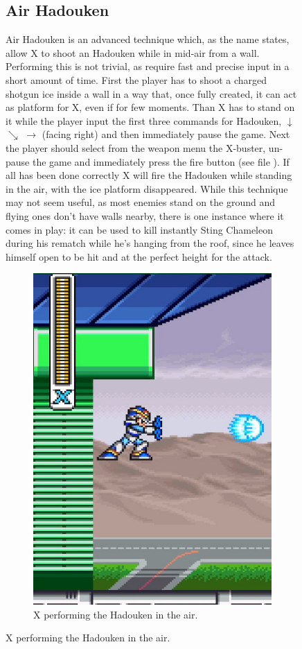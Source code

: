 \begin{figure}[htp]
\subsection{Air Hadouken}
Air Hadouken is an advanced technique which, as the name states, allow X to shoot an Hadouken while in mid-air from a wall. Performing this is not trivial, as require fast and precise input in a short amount of time. First the player has to shoot a charged shotgun ice inside a wall in a way that, once fully created, it can act as platform for X, even if for few moments. Than X has to stand on it while the player input the first three commands for Hadouken, $\downarrow$ $\searrow$ $\rightarrow$ (facing right) and then immediately pause the game. Next the player should select from the weapon menu the X-buster, un-pause the game and immediately press the fire button (see file ). If all has been done correctly X will fire the Hadouken while standing in the air, with the ice platform disappeared. While this technique may not seem useful, as most enemies stand on the ground and flying ones don't have walls nearby, there is one instance where it comes in play: it can be used to kill instantly Sting Chameleon during his rematch while he's hanging from the roof, since he leaves himself open to be hit and at the perfect height for the attack.
\begin{figure}[htp]
	\centering
	\includegraphics[width=0.4\linewidth]{figures/X1/Miscs/Flying_hadouken.jpg}
	\caption{X performing the Hadouken in the air.}
\end{figure}


\end{figure}
